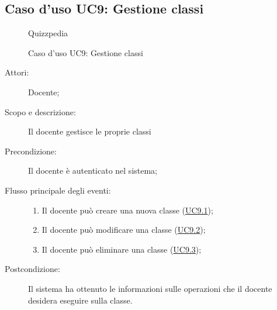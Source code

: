 \subsection{Caso d'uso UC9: Gestione classi}
        \begin{figure}[H]
            \centering
            \begin{resizedtikzpicture}{\textwidth}
		\begin{umlsystem}[x=0, fill=lightgray!20]{Quizzpedia}
		\end{umlsystem}
            \end{resizedtikzpicture}
            \caption{Caso d'uso UC9: Gestione classi}
            \label{fig:UC9} 
        \end{figure}
    \begin{description}
\item[Attori:] Docente;
\item[Scopo e descrizione:] Il docente gestisce le proprie classi
      \item[Precondizione:] Il docente è autenticato nel sistema;

        \item[Flusso principale degli eventi:] \begin{enumerate}
          \item Il docente può creare una nuova classe (\hyperlink{UC9.1}{UC9.1});
          \item Il docente può modificare una classe (\hyperlink{UC9.2}{UC9.2});
          \item Il docente può eliminare una classe (\hyperlink{UC9.3}{UC9.3});

      \end{enumerate}
    \item[Postcondizione:] Il sistema ha ottenuto le informazioni sulle operazioni che il docente desidera eseguire sulla classe.
  \end{description}
\hypertarget{UC9.1}{}
